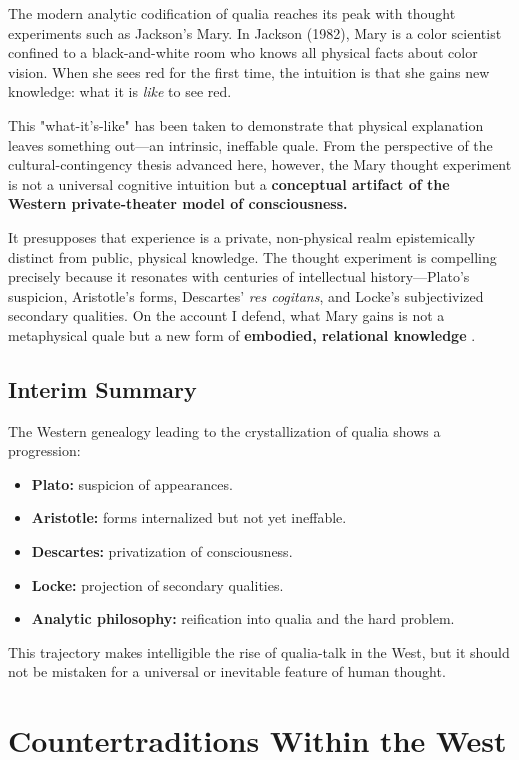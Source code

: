 \documentclass[11pt,a4paper]{article}
\begin{document}
The modern analytic codification of qualia reaches its peak with thought experiments such as Jackson's Mary. In Jackson (1982), Mary is a color scientist confined to a black-and-white room who knows all physical facts about color vision. When she sees red for the first time, the intuition is that she gains new knowledge: what it is \emph{like} to see red.

This "what-it's-like" has been taken to demonstrate that physical explanation leaves something out—an intrinsic, ineffable quale. From the perspective of the cultural-contingency thesis advanced here, however, the Mary thought experiment is not a universal cognitive intuition but a \textbf{conceptual artifact of the Western private-theater model of consciousness.}

It presupposes that experience is a private, non-physical realm epistemically distinct from public, physical knowledge. The thought experiment is compelling precisely because it resonates with centuries of intellectual history—Plato's suspicion, Aristotle's forms, Descartes' \emph{res cogitans}, and Locke's subjectivized secondary qualities. On the account I defend, what Mary gains is not a metaphysical quale but a new form of \textbf{embodied, relational knowledge} \cite{lewis1990, nemirow1980}.

\subsection{Interim Summary}

The Western genealogy leading to the crystallization of qualia shows a progression:

\begin{itemize}
\item \textbf{Plato:} suspicion of appearances.
\item \textbf{Aristotle:} forms internalized but not yet ineffable.
\item \textbf{Descartes:} privatization of consciousness.
\item \textbf{Locke:} projection of secondary qualities.
\item \textbf{Analytic philosophy:} reification into qualia and the hard problem.
\end{itemize}

This trajectory makes intelligible the rise of qualia-talk in the West, but it should not be mistaken for a universal or inevitable feature of human thought.

\section{Countertraditions Within the West}
\end{document}
